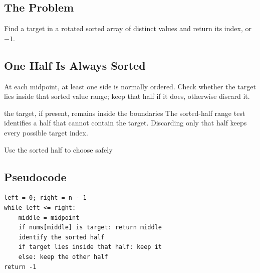 
\subsection{The Problem}
Find a target in a rotated sorted array of distinct values and return its
index, or \(-1\).

\subsection{One Half Is Always Sorted}
At each midpoint, at least one side is normally ordered. Check whether the
target lies inside that sorted value range; keep that half if it does,
otherwise discard it.

\begin{invariantbox}{the target, if present, remains inside the boundaries}
The sorted-half range test identifies a half that cannot contain the target.
Discarding only that half keeps every possible target index.
\end{invariantbox}

\begin{visualbox}{Use the sorted half to choose safely}
\centering
{}
\end{visualbox}

\subsection{Pseudocode}
\begin{lstlisting}[style=pseudocode]
left = 0; right = n - 1
while left <= right:
    middle = midpoint
    if nums[middle] is target: return middle
    identify the sorted half
    if target lies inside that half: keep it
    else: keep the other half
return -1
\end{lstlisting}

